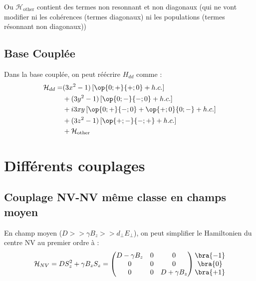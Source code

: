 \documentclass[a4paper]{article}
\begin{document}
  Ou $\mathcal{H}_{\mathrm{other}}$ contient des termes non resonnant et non diagonaux (qui ne vont modifier ni les cohérences (termes diagonaux) ni les populations (termes résonnant non diagonaux))
   \subsection{Base Couplée}
  Dans la base couplée, on peut réécrire $H_{dd}$ comme :
  \begin{align}
  \mathcal{H}_{dd}=&(3x^2-1)\left[\op{0;+}{+;0}+ h.c. \right]\\
  &+(3y^2-1)\left[\op{0;-}{-;0}+ h.c. \right]\\
  &+i3xy\left[\op{0;+}{-;0}+\op{+;0}{0;-} +h.c. \right]\\
  &+(3z^2-1)\left[\op{+;-}{-;+}+ h.c.\right]\\
  &+\mathcal{H}_{\mathrm{other}}
  \end{align}
  
  \section{Différents couplages}
  \subsection{Couplage NV-NV même classe en champs moyen}
  En champ moyen ($D >> \gamma B_z >> d_\perp E_\perp$), on peut simplifier le Hamiltonien du centre NV au premier ordre à :
  \begin{equation}
  \mathcal{H}_{NV}=D S_z^2 + \gamma B_z S_z= 
  \begin{pmatrix}
	D-\gamma B_z &0&0 \\
	0 &0&0\\
	0&0& D+ \gamma B_z
  \end{pmatrix}
  \begin{matrix}
  \bra{-1} \\
  \bra{0} \\
  \bra{+1}
  \end{matrix}
  \end{equation}
  
\end{document}
